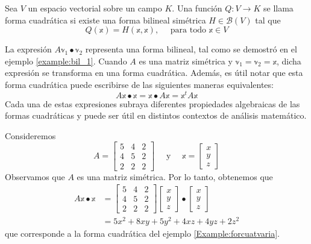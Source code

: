 \begin{definition}
    Sea $V$ un espacio vectorial sobre un campo $K$. Una función $Q: V \longrightarrow K$ se llama forma cuadrática si existe una forma bilineal simétrica $H \in \mathcal{B}(V)$ tal que
    $$Q(\mathbb{x}) = H(\mathbb{x}, \mathbb{x}), \quad \text{ para todo } \mathbb{x} \in V$$
\end{definition}

\begin{observation}
    La expresión $A\mathbb{v}_1 \bullet \mathbb{v}_2$ representa una forma bilineal, tal como se demostró en el ejemplo \ref{example:bil_1}. Cuando $A$ es una matriz simétrica y $\mathbb{v}_1 = \mathbb{v}_2 = \mathbb{x}$, dicha expresión se transforma en una forma cuadrática. Además, es útil notar que esta forma cuadrática puede escribirse de las siguientes maneras equivalentes:
    $$A\mathbb{x} \bullet \mathbb{x} = \mathbb{x} \bullet A\mathbb{x} = \mathbb{x}^t A\mathbb{x}$$
    Cada una de estas expresiones subraya diferentes propiedades algebraicas de las formas cuadráticas y puede ser útil en distintos contextos de análisis matemático.
\end{observation}

\begin{example}
    Consideremos
    $$A = \begin{bmatrix}
        5 & 4 & 2 \\
        4 & 5 & 2 \\
        2 & 2 & 2
    \end{bmatrix} \quad \text{ y } \quad \mathbb{x} = \begin{bmatrix}
        x \\
        y \\
        z
    \end{bmatrix}$$
    Observamos que $A$ es una matriz simétrica. Por lo tanto, obtenemos que
    \begin{align*}
        A\mathbb{x} \bullet \mathbb{x} & = \begin{bmatrix}
            5 & 4 & 2 \\
            4 & 5 & 2 \\
            2 & 2 & 2
        \end{bmatrix} \begin{bmatrix}
            x \\
            y \\
            z
        \end{bmatrix} \bullet \begin{bmatrix}
            x \\
            y \\
            z
        \end{bmatrix} \\
        & = 5x^2 + 8xy + 5y^2 + 4xz + 4yz + 2z^2
    \end{align*}
    que corresponde a la forma cuadrática del ejemplo \ref{Example:forcuatvaria}.
\end{example}

